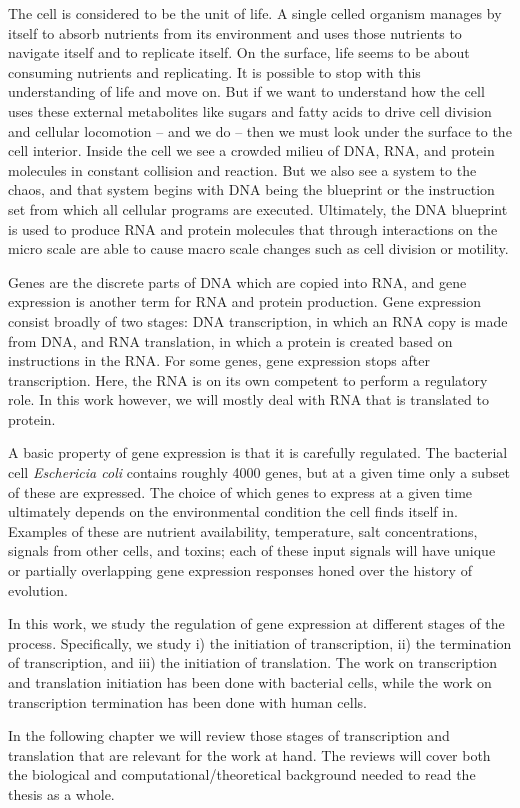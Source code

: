 %

The cell is considered to be the unit of life. A single celled organism manages
by itself to absorb nutrients from its environment and uses those nutrients to
navigate itself and to replicate itself. On the surface, life seems to be about
consuming nutrients and replicating. It is possible to stop with this
understanding of life and move on. But if we want to understand how the cell
uses these external metabolites like sugars and fatty acids to drive cell
division and cellular locomotion -- and we do -- then we must look under the
surface to the cell interior. Inside the cell we see a crowded milieu of DNA,
RNA, and protein molecules in constant collision and reaction. But we also see
a system to the chaos, and that system begins with DNA being the blueprint or
the instruction set from which all cellular programs are executed. Ultimately,
the DNA blueprint is used to produce RNA and protein molecules that through
interactions on the micro scale are able to cause macro scale changes such as
cell division or motility.

Genes are the discrete parts of DNA which are copied into RNA, and gene
expression is another term for RNA and protein production. Gene expression
consist broadly of two stages: DNA transcription, in which an RNA copy is made
from DNA, and RNA translation, in which a protein is created based on
instructions in the RNA. For some genes, gene expression stops after
transcription. Here, the RNA is on its own competent to perform a regulatory
role. In this work however, we will mostly deal with RNA that is translated to
protein.

A basic property of gene expression is that it is carefully regulated. The
bacterial cell \textit{Eschericia coli} contains roughly 4000 genes, but at a
given time only a subset of these are expressed. The choice of which genes to
express at a given time ultimately depends on the environmental condition the
cell finds itself in. Examples of these are nutrient availability, temperature,
salt concentrations, signals from other cells, and toxins; each of these input
signals will have unique or partially overlapping gene expression responses
honed over the history of evolution.

In this work, we study the regulation of gene expression at different stages of
the process. Specifically, we study i) the initiation of transcription, ii) the
termination of transcription, and iii) the initiation of translation. The work
on transcription and translation initiation has been done with bacterial cells,
while the work on transcription termination has been done with human cells.

In the following chapter we will review those stages of transcription and
translation that are relevant for the work at hand. The reviews will cover both
the biological and computational/theoretical background needed to read the
thesis as a whole.

